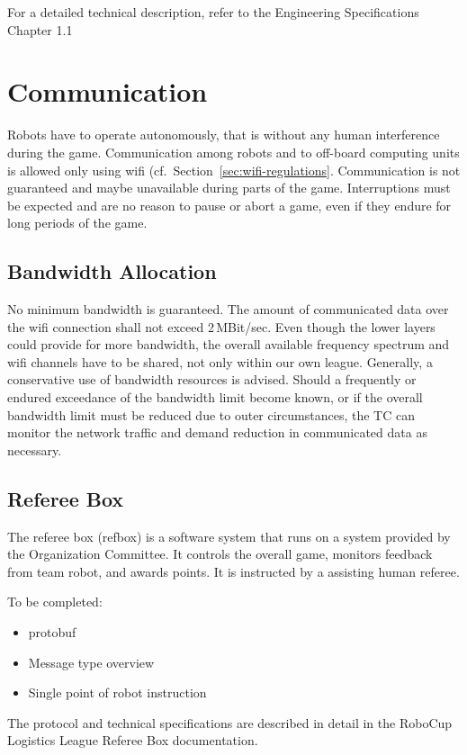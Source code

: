\documentclass[12pt,twoside]{article}
\newcommand{\refsec}[1]{Section~\ref{#1}}
\begin{document}
For a detailed technical description, refer to the Engineering
Specifications Chapter 1.1 

\section{Communication}
Robots have to operate autonomously, that is without any human
interference during the game. Communication among robots and to
off-board computing units is allowed only using wifi
(cf.~\refsec{sec:wifi-regulations}. Communication is not guaranteed
and maybe unavailable during parts of the game. Interruptions must be
expected and are no reason to pause or abort a game, even if they
endure for long periods of the game.

\subsection{Bandwidth Allocation}
\label{sec:bandwidth}
No minimum bandwidth is guaranteed. The amount of communicated data
over the wifi connection shall not exceed 2\,MBit/sec. Even though the
lower layers could provide for more bandwidth, the overall available
frequency spectrum and wifi channels have to be shared, not only
within our own league. Generally, a conservative use of bandwidth
resources is advised. Should a frequently or endured exceedance of the
bandwidth limit become known, or if the overall bandwidth limit must
be reduced due to outer circumstances, the TC can monitor the network
traffic and demand reduction in communicated data as necessary.

\subsection{Referee Box}
\label{sec:refbox}
The referee box (refbox) is a software system that runs on a system
provided by the Organization Committee. It controls the overall game,
monitors feedback from team robot, and awards points. It is instructed
by a assisting human referee.

To be completed:
\begin{itemize}
\item protobuf
\item Message type overview
\item Single point of robot instruction
\end{itemize}

The protocol and technical specifications are described in detail in
the RoboCup Logistics League Referee Box documentation.
\end{document}
